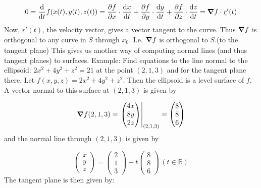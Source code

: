 \documentclass{article}
\newcommand{\n}{\leavevmode \newline} %
\newcommand{\nn}{\leavevmode \newline \newline} %
\newcommand{\R}{\mathbb{R}} %
\numberwithin{equation}{subsection} %
\begin{document}
\begin{equation}
    0 = \dv{t} f(x(t),y(t),z(t)) = \pdv{f}{x}\cdot\dv{x}{t} + \pdv{f}{y}\cdot\dv{y}{t} + \pdv{f}{z}\cdot\dv{z}{t} = \grad f \cdot \underline{r}'(t)
\end{equation}
\n
Now, $r'(t)$, the velocity vector, gives a vector tangent to the curve. Thus $\grad f$ is orthogonal to any curve in $S$ through $\underline{x_0}$. I.e. $\grad f$ is orthogonal to $S$.(to the tangent plane)
\nn
This gives us another way of computing normal lines (and thus tangent planes) to surfaces.
\nn
Example: Find equations to the line normal to the ellipsoid: $2x^2+4y^2+z^2=21$ at the point $(2,1,3)$ and for the tangent plane there.
\nn
Let $f(x,y,z)=2x^2+4y^2+z^2$. Then the ellipsoid is a level surface of $f$. A vector normal to this surface at $(2,1,3)$ is given by

\begin{equation}
    \grad f(2,1,3) =
    \left.
    \begin{pmatrix}
    4x \\ 8y \\ 2z
    \end{pmatrix}
    \right|_{(2,1,3)}
    =
    \begin{pmatrix}
    8 \\ 8 \\ 6
    \end{pmatrix}
\end{equation}
\n
and the normal line through $(2,1,3)$ is given by

\begin{equation}
    \begin{pmatrix}
    x \\ y \\ z
    \end{pmatrix}
    =
    \begin{pmatrix}
    2 \\ 1 \\ 3
    \end{pmatrix}
    + t
    \begin{pmatrix}
    8 \\ 8 \\ 6
    \end{pmatrix}
    \, (t\in\R)
\end{equation}
\n
The tangent plane is then given by:
\end{document}
